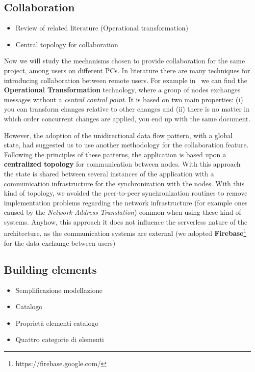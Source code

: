 \subsection{Collaboration}

\begin{itemize}
 \item Review of related literature (Operational transformation)
 \item Central topology for collaboration
\end{itemize}

Now we will study the mechanisms chosen to provide collaboration for the same project, among users on different PCs. In literature there are many techniques for introducing collaboration between remote users. For example in~\cite{Ellis:1989:CCG:66926.66963} we can find the \textbf{Operational Transformation} technology, where a group of nodes exchanges messages without a \textit{central control point}. It is based on two main properties: (i) you can transform changes relative to other changes and (ii) there is no matter in which order concurrent changes are applied, you end up with the same document.

However, the adoption of the unidirectional data flow pattern, with a global state, had suggested us to use another methodology for the collaboration feature. Following the principles of these patterns, the application is based upon a \textbf{centralized topology} for communication between nodes. With this approach the state is shared between several instances of the application with a communication infrastructure for the synchronization with the nodes. With this kind of topology, we avoided the peer-to-peer synchronization routines to remove implementation problems regarding the network infrastructure (for example ones caused by the \textit{Network Address Translation}) common when using these kind of systems. Anyhow, this approach it does not influence the serverless nature of the architecture, as the communication systems are external (we adopted \textbf{Firebase}\footnote{https://firebase.google.com/} for the data exchange between users)


\subsection{Building elements}\label{building_elements}

\begin{itemize}
 \item Semplificazione modellazione
 \item Catalogo
 \item Propriet\`a elementi catalogo
 \item Quattro categorie di elementi
\end{itemize}

